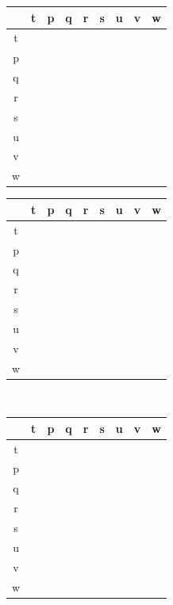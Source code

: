 \documentclass{article}
\renewcommand{\r}{\right}
\newcommand{\p}{{\color{tablep}{p}}}
\newcommand{\q}{{\color{tableq}{q}}}
\renewcommand{\r}{{\color{tabler}{r}}}
\newcommand{\s}{{\color{tables}{s}}}
\renewcommand{\t}{{\color{tablet}{t}}}
\renewcommand{\u}{{\color{tableu}{u}}}
\renewcommand{\v}{{\color{tablev}{v}}}
\newcommand{\w}{{\color{tablew}{w}}}
\renewcommand{\S}{\hphantom{\w}}
\begin{document}
  \begin{tabular}{|c|cccccccc|}
    \hline
     & t & p & q & r & s & u & v & w \\
    \hline
    t&\t &\p &\q &\r &\s &\u &\v &\w \\
    p&\p &\u &\s &\t &\v &\r &\S &\q \\
    q&\q &\s &\r &\w &\t &\v &   &   \\
    r&\r &\t &\w &   &\q &\p &\s &\v \\
    s&\s &\v &   &   &\p &\w &\u &\r \\
    u&\u &\r &\v &\p &\w &   &\q &   \\
    v&\v &\S &\p &\s &\u &   &\r &\t \\
    w&\w &\q &   &\v &   &\s &\t &\p \\
    \hline
  \end{tabular}
  \begin{tabular}{|c|cccccccc|}
    \hline
     & t & p & q & r & s & u & v & w \\
    \hline
    t&\t &\p &\q &\r &\s &\u &\v &\w \\
    p&\p &\u &\s &\t &\v &\r &\w &\q \\
    q&\q &\s &\r &\w &\t &\v &   &   \\
    r&\r &\t &\w &\u &\q &\p &\s &\v \\
    s&\s &\v &   &   &\p &\w &\u &\r \\
    u&\u &\r &\v &\p &\w &   &\q &   \\
    v&\v &\w &\p &\s &\u &   &\r &\t \\
    w&\w &\q &   &\v &\r &\s &\t &\p \\
    \hline
  \end{tabular} \\
  \begin{tabular}{|c|cccccccc|}
    \hline
     & t & p & q & r & s & u & v & w \\
    \hline
    t&\t &\p &\q &\r &\s &\u &\v &\w \\
    p&\p &\u &\s &\t &\v &\r &\w &\q \\
    q&\q &\s &\r &\w &\t &\v &\p &   \\
    r&\r &\t &\w &\u &\q &\p &\s &\v \\
    s&\s &\v &   &\q &\p &\w &\u &\r \\
    u&\u &\r &\v &\p &\w &   &\q &   \\
    v&\v &\w &\p &\s &\u &\q &\r &\t \\
    w&\w &\q &\u &\v &\r &\s &\t &\p \\
    \hline
  \end{tabular}
\end{document}
